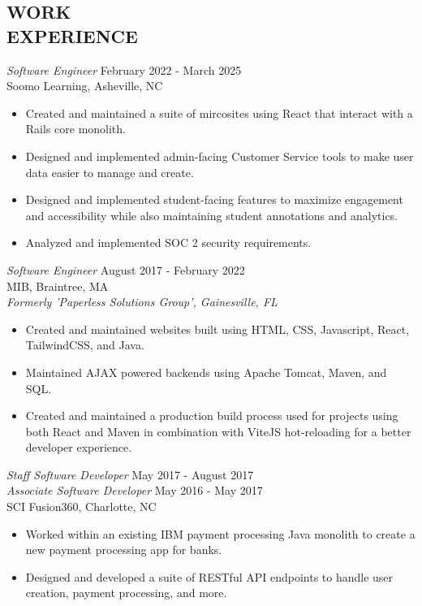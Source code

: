 \documentclass[margin, 10pt]{res} %
\begin{document}
\begin{resume}
\section{WORK \\ EXPERIENCE}

{\sl Software Engineer} \hfill February 2022 - March 2025 \\
Soomo Learning, Asheville, NC \\
\begin{itemize}
\item Created and maintained a suite of mircosites using React that interact with a Rails core monolith.
\item Designed and implemented admin-facing Customer Service tools to make user data easier to manage and create.
\item Designed and implemented student-facing features to maximize engagement and accessibility while also maintaining student annotations and analytics.
\item Analyzed and implemented SOC 2 security requirements.
\end{itemize} 

{\sl Software Engineer} \hfill August 2017 - February 2022 \\
MIB, Braintree, MA \\
{\sl Formerly 'Paperless Solutions Group', Gainesville, FL}
\begin{itemize}
\item Created and maintained websites built using HTML, CSS, Javascript, React, TailwindCSS, and Java.
\item Maintained AJAX powered backends using Apache Tomcat, Maven, and SQL.
\item Created and maintained a production build process used for projects using both React and Maven in combination with ViteJS hot-reloading for a better developer experience.
\end{itemize} 

{\sl Staff Software Developer} \hfill May 2017 - August 2017 \\
{\sl Associate Software Developer} \hfill May 2016 - May 2017 \\
SCI Fusion360, Charlotte, NC
\begin{itemize}
\item Worked within an existing IBM payment processing Java monolith to create a new payment processing app for banks.
\item Designed and developed a suite of RESTful API endpoints to handle user creation, payment processing, and more. 
\end{itemize} 


\end{resume}
\end{document}
